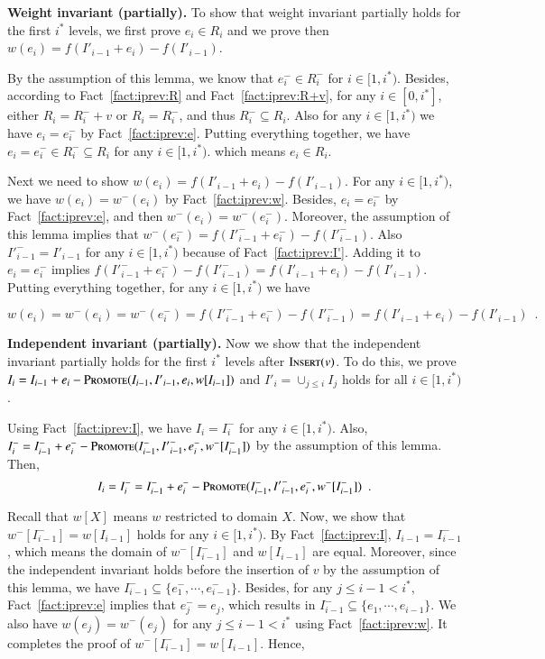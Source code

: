 \documentclass[11pt]{article}
\newcommand{\replacementTester}{\textsc{Promote}}
\newcommand{\insertv}{{\textsc{Insert}}}
\begin{document}
\textbf{Weight invariant (partially).}
To show that weight invariant partially holds for the first $i^*$ levels, we first prove $e_i\in R_i$ and we prove then $w(e_i) = f(I'_{i - 1} + e_i) - f(I'_{i - 1})$.

By the assumption of this lemma, we know that $e_i^- \in R_i^-$ for $i \in [1, i^*)$.
Besides, according to Fact~\ref{fact:iprev:R} and Fact~\ref{fact:iprev:R+v}, for any $i \in [0,i^*]$, either $R_i=R_i^-+v$ or $R_i=R_i^-$, and thus $R_i^- \subseteq R_i$. Also for any $i \in [1, i^*)$ we have $e_i=e_i^-$ by Fact~\ref{fact:iprev:e}. Putting everything  together, we have $e_i=e_i^- \in R_i^- \subseteq R_i$ for any $i\in[1,i^*)$. which means $e_i \in R_i$. 

Next we need to show 
$w(e_i)= f(I'_{i - 1} + e_i) - f(I'_{i - 1})$.
For any $i\in[1, i^*)$, we have $w(e_i) = w^-(e_i)$ by Fact~\ref{fact:iprev:w}. Besides, $e_i=e_i^-$ by Fact~\ref{fact:iprev:e}, and then $w^-(e_i)=w^-(e_i^-)$.
Moreover, the assumption of this lemma implies that $w^-(e_i^-)=f(I'^-_{i - 1} + e_i^-) - f(I'^-_{i - 1})$.
Also $I'^-_{i - 1}=I'_{i - 1}$ for any $i\in [1,i^*)$ because of Fact~\ref{fact:iprev:I'}. Adding it to $e_i=e_i^-$ implies $f(I'^-_{i - 1} + e_i^-) - f(I'^-_{i - 1}) = f(I'_{i - 1} + e_i) - f(I'_{i - 1})$.
Putting everything together, for any $i\in [1,i^*)$ we have

\[
w(e_i) = w^-(e_i) = w^-(e_i^-)= f(I'^-_{i - 1} + e_i^-) - f(I'^-_{i - 1}) = f(I'_{i - 1} + e_i) - f(I'_{i - 1})  \enspace .
\]



\textbf{Independent invariant (partially).}
Now we show that the independent invariant partially holds for the first $i^*$ levels after $\insertv(v)$.
To do this, we prove $I_i = I_{i - 1} + e_i - \replacementTester{}(I_{i - 1},  {I'}_{i - 1}, e_i, w[I_{i - 1}])$ and  ${I'}_i = \cup_{j \le i} I_j$ holds for all $i\in[1,i^*)$.

Using Fact~\ref{fact:iprev:I}, we have $I_i = I_i^-$ for any $i\in  [1,i^*)$. Also, $I_i^- = I_{i - 1}^- + e_i^- - \replacementTester{}(I_{i - 1}^-, {I'}_{i - 1}^-, e_i^-, w^-[I_{i - 1}^-])$ by
the assumption of this lemma.  Then, 
$$ I_i = I_i^- = I_{i - 1}^- + e_i^- - \replacementTester{}(I_{i - 1}^-, {I'}_{i - 1}^-, e_i^-, w^-[I_{i - 1}^-]) \enspace.
$$

Recall that $w[X]$ means $w$ restricted to domain $X$.
Now, we show that $w^-[I_{i - 1}^-]=w[I_{i - 1}]$ holds for any $i\in[1,i^*)$.
By Fact~\ref{fact:iprev:I}, $I_{i-1} = I_{i-1}^-$, which means the domain of $w^-[I_{i - 1}^-]$ and $w[I_{i - 1}]$ are equal.
Moreover, since the independent invariant holds before the insertion of $v$ by the assumption of this lemma, we have $I_{i - 1}^- \subseteq \{e_1^-, \cdots, e_{i - 1}^-\}$.
Besides, for any $j\leq i-1 <i^*$, Fact~\ref{fact:iprev:e} implies that $e_j^-=e_j$, which results in $I_{i - 1}^- \subseteq \{e_1, \cdots, e_{i - 1}\}$.
We also have $w(e_j)=w^-(e_j)$ for any $j\leq i-1 <i^*$ using Fact~\ref{fact:iprev:w}. It completes the proof of $w^-[I_{i - 1}^-]=w[I_{i - 1}]$.
Hence,
\end{document}
